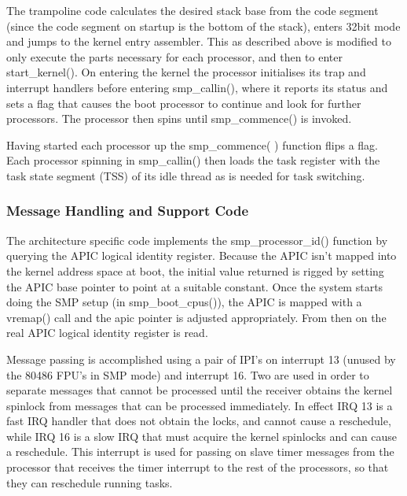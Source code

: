 \documentclass[]{article}
\begin{document}
The trampoline code calculates the desired stack base from the code 
segment (since the code segment on startup is the bottom of the stack), 
 enters 32bit mode and jumps to the kernel entry assembler. This as 
described above is modified to only execute the parts necessary for each 
processor, and then to enter start\_kernel(). On entering the kernel the 
processor initialises its trap and interrupt handlers before entering 
smp\_callin(), where it reports its status and sets a flag that causes the 
boot processor to continue and look for further processors. The processor 
then spins until smp\_commence() is invoked.

Having started each processor up the smp\_commence( ) function flips a 
flag. Each processor spinning in smp\_callin() then loads the task register 
with the task state segment (TSS) of its idle thread as is needed for task 
switching.

\subsubsection{Message Handling and Support Code}
The architecture specific code implements the smp\_processor\_id() function 
by querying the APIC logical identity register. Because the APIC isn't 
mapped into the kernel address space at boot, the initial value returned is 
rigged by setting the APIC base pointer to point at a suitable constant. 
Once the system starts doing the SMP setup (in smp\_boot\_cpus()), the APIC 
is mapped with a vremap() call and the apic pointer is adjusted 
appropriately. From then on the real APIC logical identity register is 
read.

Message passing is accomplished using a pair of IPI's on interrupt 13 
(unused by the 80486 FPU's in SMP mode) and interrupt 16. Two are used in 
order to separate messages that cannot be processed until the receiver 
obtains the kernel spinlock from messages that can be processed 
immediately. In effect IRQ 13 is a fast IRQ handler that does not obtain 
the locks, and cannot cause a reschedule, while IRQ 16 is a slow IRQ that 
must acquire the kernel spinlocks and can cause a reschedule. This 
interrupt is used for passing on slave timer messages from the processor 
that receives the timer interrupt to the rest of the processors, so that 
they can reschedule running tasks.
\end{document}
